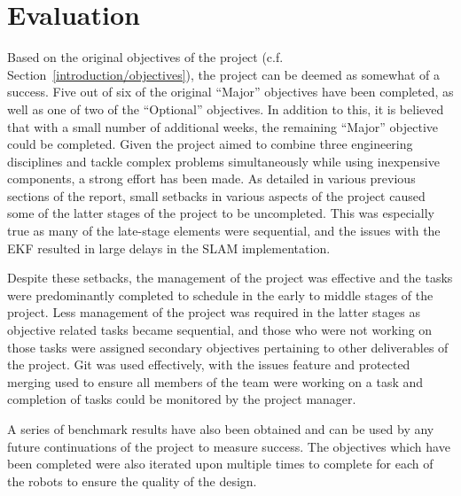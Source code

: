 
\chapter{Evaluation}\label{eval}
Based on the original objectives of the project (c.f. Section~\ref{introduction/objectives}), the project can be deemed as somewhat of a success. Five out of six of
the original ``Major'' objectives have been completed, as well as one of two of
the ``Optional'' objectives. In addition to this, it is believed that with a
small number of additional weeks, the remaining ``Major'' objective could
be completed. Given the project aimed to combine three engineering
disciplines and tackle complex problems simultaneously while using inexpensive components, a strong
effort has been made.
As detailed in various previous sections of the report, small setbacks in
various aspects of the project caused some of the latter stages of the project to be
uncompleted. This was especially true as many of the late-stage elements were sequential,
and the issues with the EKF resulted in large delays in the SLAM implementation.

Despite these setbacks, the management of the project was effective and the tasks were predominantly completed to schedule in the early to middle
stages of the project. Less management of the project was required in the latter
stages as objective related tasks became sequential, and those who were not
working on those tasks were assigned secondary objectives pertaining to other deliverables of the project. Git was used effectively, with the
issues feature and protected merging used to ensure all members of the team were
working on a task and completion of tasks could be monitored by the project
manager.

A series of benchmark results have also been obtained and can be used by any future
continuations of the project to measure success. The
objectives which have been completed were also iterated upon multiple times to
complete for each of the robots to ensure the quality of the design.


